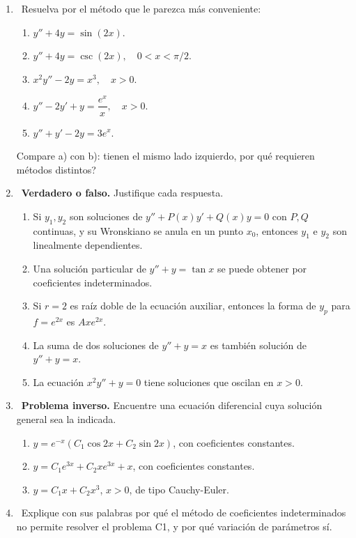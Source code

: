 \begin{enumerate}[label=\textbf{F\arabic*.}, leftmargin=*]
    \item \medio\ Resuelva por el m\'etodo que le parezca m\'as conveniente:
    \begin{enumerate}[label=\alph*)]
        \item $y''+4y=\sin(2x)$.
        \item $y''+4y=\csc(2x),\quad 0<x<\pi/2$.
        \item $x^2y''-2y=x^3,\quad x>0$.
        \item $y''-2y'+y=\dfrac{e^x}{x},\quad x>0$.
        \item $y''+y'-2y=3e^x$.
    \end{enumerate}
    Compare a) con b): tienen el mismo lado izquierdo, \textquestiondown por qu\'e requieren m\'etodos distintos?
    \item \facil\ \textbf{Verdadero o falso.} Justifique cada respuesta.
    \begin{enumerate}[label=\alph*)]
        \item Si $y_1,y_2$ son soluciones de $y''+P(x)y'+Q(x)y=0$ con $P,Q$ continuas, y su Wronskiano se anula en un punto $x_0$, entonces $y_1$ e $y_2$ son linealmente dependientes.
        \item Una soluci\'on particular de $y''+y=\tan x$ se puede obtener por coeficientes indeterminados.
        \item Si $r=2$ es ra\'iz doble de la ecuaci\'on auxiliar, entonces la forma de $y_p$ para $f=e^{2x}$ es $Axe^{2x}$.
        \item La suma de dos soluciones de $y''+y=x$ es tambi\'en soluci\'on de $y''+y=x$.
        \item La ecuaci\'on $x^2y''+y=0$ tiene soluciones que oscilan en $x>0$.
    \end{enumerate}
    \item \medio\ \textbf{Problema inverso.} Encuentre una ecuaci\'on diferencial cuya soluci\'on general sea la indicada.
    \begin{enumerate}[label=\alph*)]
        \item $y=e^{-x}\left(C_1\cos 2x+C_2\sin 2x\right)$, con coeficientes constantes.
        \item $y=C_1e^{3x}+C_2xe^{3x}+x$, con coeficientes constantes.
        \item $y=C_1x+C_2x^3$, $x>0$, de tipo Cauchy-Euler.
    \end{enumerate}
    \item \facil\ Explique con sus palabras por qu\'e el m\'etodo de coeficientes indeterminados no permite resolver el problema C1, y por qu\'e variaci\'on de par\'ametros s\'i.
\end{enumerate}

